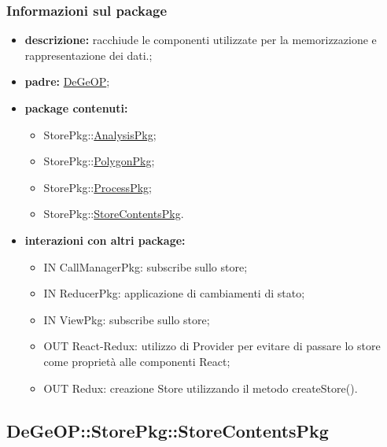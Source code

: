 \subsubsection{Informazioni sul package}
\begin{itemize}
	\item \textbf{descrizione:} racchiude le componenti utilizzate per la memorizzazione e rappresentazione dei dati.;
	\item \textbf{padre:} \hyperref[pkg::DeGeOP]{DeGeOP};
	\item \textbf{package contenuti:}
	\begin{itemize}
		\item StorePkg::\hyperref[pkg::AnalysisPkg]{AnalysisPkg};
		\item StorePkg::\hyperref[pkg::PolygonPkg]{PolygonPkg};
		\item StorePkg::\hyperref[pkg::ProcessPkg]{ProcessPkg};
		\item StorePkg::\hyperref[pkg::StoreContentsPkg]{StoreContentsPkg}.
	\end{itemize}
	\item \textbf{interazioni con altri package:} 
	\begin{itemize}
		\item IN CallManagerPkg: subscribe sullo store;
		\item IN ReducerPkg: applicazione di cambiamenti di stato;
		\item IN ViewPkg: subscribe sullo store;
		\item OUT React-Redux: utilizzo di Provider per evitare di passare lo store come proprietà alle componenti React;
		\item OUT Redux: creazione Store utilizzando il metodo createStore().
	\end{itemize}
\end{itemize}
\newpage
\subsection{DeGeOP::StorePkg::StoreContentsPkg}
\label{pkg::StoreContentsPkg}
